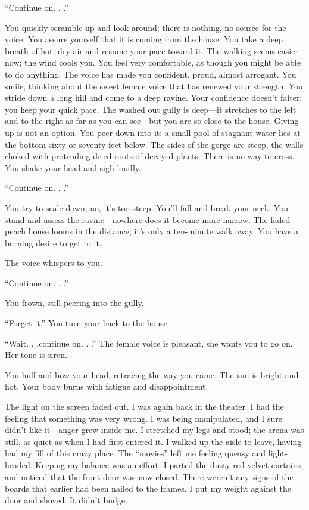 ``Continue on. . .''

You quickly scramble up and look around; there is nothing, no source for
the voice. You assure yourself that it is coming from the house. You
take a deep breath of hot, dry air and resume your pace toward it. The
walking seems easier now; the wind cools you. You feel very comfortable,
as though you might be able to do anything. The voice has made you
confident, proud, almost arrogant. You smile, thinking about the sweet
female voice that has renewed your strength. You stride down a long hill
and come to a deep ravine. Your confidence doesn't falter; you keep your
quick pace. The washed out gully is deep---it stretches to the left and
to the right as far as you can see---but you are so close to the house.
Giving up is not an option. You peer down into it; a small pool of
stagnant water lies at the bottom sixty or seventy feet below. The sides
of the gorge are steep, the walls choked with protruding dried roots of
decayed plants. There is no way to cross. You shake your head and sigh
loudly.

``Continue on. . .''

You try to scale down; no, it's too steep. You'll fall and break your
neck. You stand and assess the ravine---nowhere does it become more
narrow. The faded peach house looms in the distance; it's only a
ten-minute walk away. You have a burning desire to get to it.

The voice whispers to you.

``Continue on. . .''

You frown, still peering into the gully.

``Forget it.'' You turn your back to the house.

``Wait. . .continue on. . .'' The female voice is pleasant, she wants
you to go on. Her tone is siren.

You huff and bow your head, retracing the way you came. The sun is
bright and hot. Your body burns with fatigue and disappointment.

The light on the screen faded out. I was again back in the theater. I
had the feeling that something was very wrong. I was being manipulated,
and I sure didn't like it---anger grew inside me. I stretched my legs
and stood; the arena was still, as quiet as when I had first entered it.
I walked up the aisle to leave, having had my fill of this crazy place.
The ``movies'' left me feeling queasy and light-headed. Keeping my
balance was an effort. I parted the dusty red velvet curtains and
noticed that the front door was now closed. There weren't any signs of
the boards that earlier had been nailed to the frames. I put my weight
against the door and shoved. It didn't budge.

